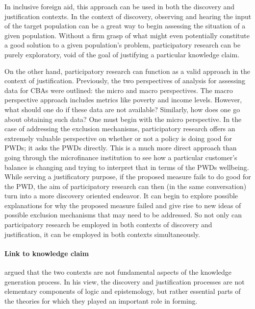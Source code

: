 \documentclass[a4paper]{article}
\begin{document}
In inclusive foreign aid, this approach can be used in both the discovery and
justification contexts. In the context of discovery, observing and hearing the
input of the target population can be a great way to begin assessing the
situation of a given population. Without a firm grasp of what might even
potentially constitute a good solution to a given population's problem,
participatory research can be purely exploratory, void of the goal of
justifying a particular knowledge claim.

On the other hand, participatory research can function as a valid approach in
the context of justification. Previously, the two perspectives of analysis for
assessing data for CBAs were outlined: the micro and macro perspectives. The
macro perspective approach includes metrics like poverty and income levels.
However, what should one do if these data are not available? Similarly, how
does one go about obtaining such data? One must begin with the micro
perspective. In the case of addressing the exclusion mechanisms, participatory
research offers an extremely valuable perspective on whether or not a policy
is doing good for PWDs; it asks the PWDs directly. This is a much more direct
approach than going through the microfinance institution to see how a
particular customer's balance is changing and trying to interpret that in
terms of the PWDs wellbeing. While serving a justificatory purpose, if the
proposed measure fails to do good for the PWD, the aim of participatory
research can then (in the same conversation) turn into a more discovery
oriented endeavor. It can begin to explore possible explanations for why the
proposed measure failed and give rise to new ideas of possible exclusion
mechanisms that may need to be addressed. So not only can participatory
research be employed in both contexts of discovery and justification, it can
be employed in both contexts simultaneously.


\paragraph{Link to knowledge claim}

\cite{kuhn1970structure} argued that the two contexts are not fundamental
aspects of the knowledge generation process. In his view, the discovery and
justification processes are not elementary components of logic and
epistemology, but rather essential parts of the theories for which they played
an important role in forming.
\end{document}
